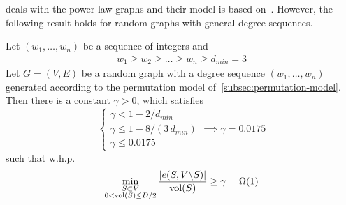 \cite{gms03} deals with the power-law graphs and their model is based on~\cite{acl01}.
However, the following result holds for random graphs with general degree sequences.

\begin{theorem}
    \label{thm:gms}
    Let $(w_1,\ldots,w_n)$ be a sequence of integers and
    \begin{gather}
        w_1\geq w_2\geq \ldots\geq w_n\geq d_{min}=3
    \end{gather}
    Let $G=(V,E)$ be a random graph with a degree sequence $(w_1,\ldots,w_n)$
    generated according to the permutation model of~\autoref{subsec:permutation-model}.
    Then there is a constant $\gamma>0$, which satisfies
    \begin{equation}
        \begin{cases}
            \gamma<1-2/d_{min}\\
            \gamma\leq1-8/(3\,d_{min})\\
            \gamma\leq 0.0175
        \end{cases}\implies
        \gamma=0.0175
    \end{equation}
    such that w.h.p.
    \begin{equation}
        \min_{\substack{S\subset V\\0<\operatorname*{vol}(S)\leq D/2}}
        \frac{|e(S,V\backslash S)|}{\operatorname*{vol}(S)}\geq\gamma=\Omega(1)
    \end{equation}
\end{theorem}

